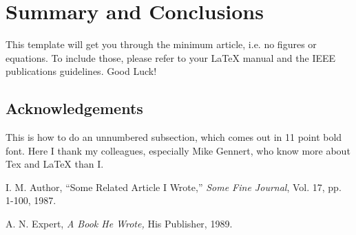 \section{Summary and Conclusions}
This template will get you through the minimum article, i.e. no figures or
equations.  To include those, please refer to your LaTeX manual and the IEEE
publications guidelines.  Good Luck!

\subsection*{Acknowledgements}
This is how to do an unnumbered subsection, which comes out in 11 point bold
font.  Here I thank my colleagues, especially Mike Gennert, who know more 
about Tex and LaTeX than I.

\begin{thebibliography}{9}

I. M. Author, 
``Some Related Article I Wrote,''
{\em Some Fine Journal}, Vol. 17, pp. 1-100, 1987.

A. N. Expert, 
{\em A Book He Wrote,}
His Publisher, 1989.

\end{thebibliography}


